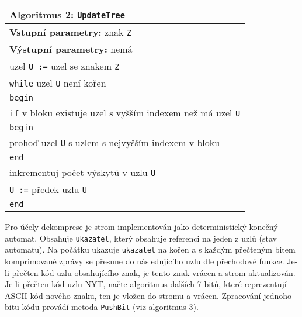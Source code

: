 \begin{table}[!h]
\centering
\begin{tabular}{l}
\hline
\textbf{Algoritmus 2:} \texttt{UpdateTree}\\
\hline
\textbf{Vstupní parametry:} znak \texttt{Z}\\
\textbf{Výstupní parametry:} nemá\\
\hline
uzel \texttt{U :=} uzel se znakem \texttt{Z}\\
\texttt{while} uzel \texttt{U} není kořen\\
\texttt{begin}\\
\hspace*{5mm}\texttt{if} v bloku existuje uzel s vyšším indexem než má uzel \texttt{U}\\
\hspace*{5mm}\texttt{begin}\\
\hspace*{10mm}prohoď uzel \texttt{U} s uzlem s nejvyšším indexem v bloku\\
\hspace*{5mm}\texttt{end}\\
\hspace*{5mm}inkrementuj počet výskytů v uzlu \texttt{U}\\
\hspace*{5mm}\texttt{U :=} předek uzlu \texttt{U}\\
\texttt{end}\\
\hline
\end{tabular}
\end{table}

Pro účely dekomprese je strom implementován jako deterministický konečný automat. Obsahuje \texttt{ukazatel}, který obsahuje referenci na jeden z uzlů (stav automatu). Na počátku ukazuje \texttt{ukazatel} na kořen a s každým přečteným bitem komprimované zprávy se přesune do následujícího uzlu dle přechodové funkce. Je-li přečten kód uzlu obsahujícího znak, je tento znak vrácen a strom aktualizován. Je-li přečten kód uzlu NYT, načte algoritmus dalších 7 bitů, které reprezentují ASCII kód nového znaku, ten je vložen do stromu a vrácen. Zpracování jednoho bitu kódu provádí metoda \texttt{PushBit} (viz algoritmus 3).

